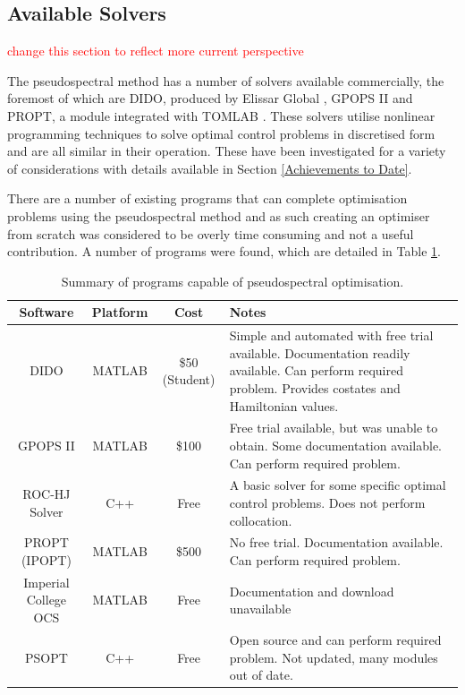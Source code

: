 \subsection{Available Solvers}
\textcolor{red}{change this section to reflect more current perspective}

The pseudospectral method has a number of solvers available commercially, the foremost of which are DIDO, produced by Elissar Global \cite{Ross2002}, GPOPS II \cite{Rao2010} and PROPT, a module integrated with TOMLAB \cite{Rutquist2010}. These solvers utilise nonlinear programming techniques to solve optimal control problems in discretised form and are all similar in their operation. These have been investigated for a variety of considerations with details available in Section \ref{Achievements to Date}. 

There are a number of existing programs that can complete optimisation problems using the pseudospectral method and as such creating an optimiser from scratch was considered to be overly time consuming and not a useful contribution. A number of programs were found, which are detailed in Table \ref{table:programs}.
\begin{table}[!ht]
	
	\begin{tabular}{|c|c|c| p{7cm}|}
		\hline \textbf{Software} & \textbf{Platform} & \textbf{Cost} & \textbf{Notes} \\ 
		\hline DIDO & MATLAB & \$50 (Student) & Simple and automated with free trial available. Documentation readily available. Can perform required problem. Provides costates and Hamiltonian values.\\ 
		\hline GPOPS II & MATLAB & \$100 & Free trial available, but was unable to obtain. Some documentation available. Can perform required problem.\\ 
		\hline ROC-HJ Solver & C++ & Free & A basic solver for some specific optimal control problems. Does not perform collocation. \\ 
		\hline PROPT (IPOPT) & MATLAB & \$500 & No free trial. Documentation available. Can perform required problem. \\ 
		\hline Imperial College OCS & MATLAB & Free & Documentation and download unavailable \\ 
		\hline PSOPT & C++ & Free & Open source and can perform required problem. Not updated, many modules out of date. \\ 
		\hline 
	\end{tabular} 
	
	\caption{Summary of programs capable of pseudospectral optimisation.}
	\label{table:programs}
\end{table}
